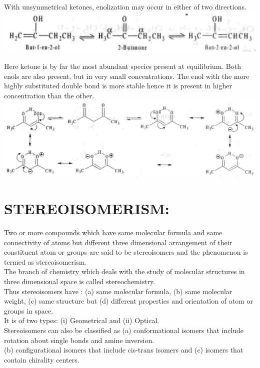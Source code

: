 \documentclass[10pt]{article}
\begin{document}
With unsymmetrical ketones, enolization may occur in either of two directions.\\
\includegraphics[max width=\textwidth, center]{2025_01_28_8470952b98110cec3aabg-044(1)}

Here ketone is by far the most abundant species present at equilibrium. Both enols are also present, but in very small concentrations. The enol with the more highly substituted double bond is more stable hence it is present in higher concentration than the other.\\
\includegraphics[max width=\textwidth, center]{2025_01_28_8470952b98110cec3aabg-044(3)}

\section*{STEREOISOMERISM:}
Two or more compounds which have same molecular formula and same connectivity of atoms but different three dimensional arrangement of their constituent atom or groups are said to be stereoisomers and the phenomenon is termed as stereoisomerism.\\
The branch of chemistry which deals with the study of molecular structures in three dimensional space is called stereochemistry.\\
Thus stereoisomers have : (a) same molecular formula, (b) same molecular weight, (c) same structure but (d) different properties and orientation of atom or groups in space.\\
It is of two types: (i) Geometrical and (ii) Optical.\\
Stereoisomers can also be classified as (a) conformational isomers that include rotation about single bonds and amine inversion.\\
(b) configurational isomers that include cis-trans isomers and (c) isomers that contain chirality centers.
\end{document}
